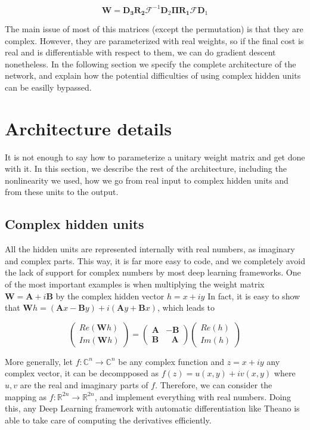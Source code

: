 \documentclass{article} %
\newcommand{\matr}[1]{\mathbf{#1}}
\newcommand\RR{\mathbb{R}}
\newcommand\CC{\mathbb{C}}
\begin{document}
$$ \matr{W} = \matr{D_3} \matr{R_2} \mathcal{F}^{-1} \matr{D}_2 \matr{\Pi} \matr{R_1} \mathcal{F} \matr{D}_1 $$

The main issue of most of this matrices (except the permutation) is that they are complex. However, they are parameterized with real weights, so if the final cost is real and is differentiable with respect to them, we can do gradient descent nonetheless. In the following section we specify the complete architecture of the network, and explain how the potential difficulties of using complex hidden units can be easilly bypassed.

\section{Architecture details}

It is not enough to say how to parameterize a unitary weight matrix and get done with it. In this section, we describe the rest of the architecture, including the nonlinearity we used, how we go from real input to complex hidden units and from these units to the output.

\subsection{Complex hidden units}

All the hidden units are represented internally with real numbers, as imaginary and complex parts. This way, it is far more easy to code, and we completely avoid the lack of support for complex numbers by most deep learning frameworks. One of the most important examples is when multiplying the weight matrix $\matr{W} = \matr{A} + i \matr{B}$ by the complex hidden vector $h = x + i y$ In fact, it is easy to show that $ \matr{W}h = (\matr{A}x - \matr{B}y) + i (\matr{A}y + \matr{B}x) $, which leads to


$$ \begin{pmatrix} Re(\matr{W}h) \\ Im(\matr{W}h) \end{pmatrix}  = \begin{pmatrix} \matr{A} & -\matr{B} \\ \matr{B} & \ \ \ \matr{A} \end{pmatrix} \begin{pmatrix} Re(h) \\ Im(h) \end{pmatrix}$$

More generally, let $f: \CC^n \rightarrow \CC^n$ be any complex function and $z = x + i y$ any complex vector, it can be decompposed as $ f(z) = u(x, y) + i v(x, y) $ where $u,v$ are the real and imaginary parts of $f$. Therefore, we can consider the mapping as $f: \RR^{2n}  \rightarrow \RR^{2n}$, and implement everything with real numbers. Doing this, any Deep Learning framework with automatic differentiation like Theano \citep{Fred2010} is able to take care of computing the derivatives efficiently.
\end{document}
